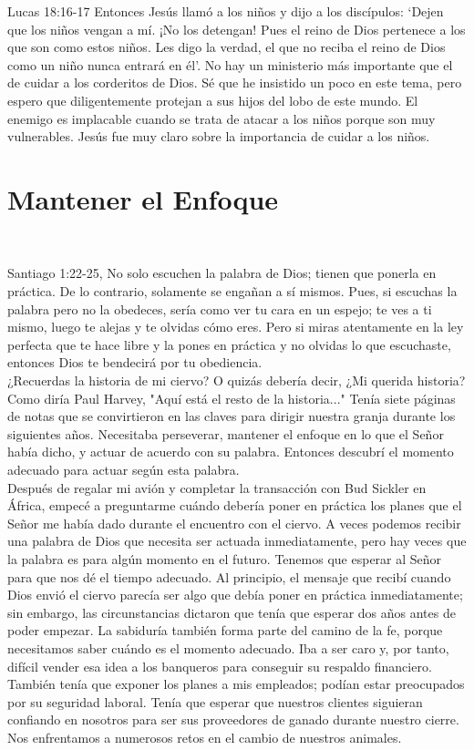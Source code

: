 \documentclass[twoside, 12pt]{book}
\begin{document}
Lucas 18:16-17 Entonces Jesús llamó a los niños y dijo a los discípulos: ‘Dejen que los niños vengan a mí. ¡No los detengan! Pues el reino de Dios pertenece a los que son como estos niños. Les digo la verdad, el que no reciba el reino de Dios como un niño nunca entrará en él’.
No hay un ministerio más importante que el de cuidar a los corderitos de Dios. Sé que he insistido un poco en este tema, pero espero que diligentemente protejan a sus hijos del lobo de este mundo. El enemigo es implacable cuando se trata de atacar a los niños porque son muy vulnerables. Jesús fue muy claro sobre la importancia de cuidar a los niños.\\





\chapter{Mantener el Enfoque}
\

Santiago 1:22-25, No solo escuchen la palabra de Dios; tienen que ponerla en práctica. De lo contrario, solamente se engañan a sí mismos. Pues, si escuchas la palabra pero no la obedeces, sería como ver tu cara en un espejo; te ves a ti mismo, luego te alejas y te olvidas cómo eres. Pero si miras atentamente en la ley perfecta que te hace libre y la pones en práctica y no olvidas lo que escuchaste, entonces Dios te bendecirá por tu obediencia.\\
 
¿Recuerdas la historia de mi ciervo? O quizás debería decir, ¿Mi querida historia? Como diría Paul Harvey, "Aquí está el resto de la historia..." Tenía siete páginas de notas que se convirtieron en las claves para dirigir nuestra granja durante los siguientes años. Necesitaba perseverar, mantener el enfoque en lo que el Señor había dicho, y actuar de acuerdo con su palabra. Entonces descubrí el momento adecuado para actuar según esta palabra.\\

Después de regalar mi avión y completar la transacción con Bud Sickler en África, empecé a preguntarme cuándo debería poner en práctica los planes que el Señor me había dado durante el encuentro con el ciervo. A veces podemos recibir una palabra de Dios que necesita ser actuada inmediatamente, pero hay veces que la palabra es para algún momento en el futuro. Tenemos que esperar al Señor para que nos dé el tiempo adecuado. Al principio, el mensaje que recibí cuando Dios envió el ciervo parecía ser algo que debía poner en práctica inmediatamente; sin embargo, las circunstancias dictaron que tenía que esperar dos años antes de poder empezar. La sabiduría también forma parte del camino de la fe, porque necesitamos saber cuándo es el momento adecuado. Iba a ser caro y, por tanto, difícil vender esa idea a los banqueros para conseguir su respaldo financiero. También tenía que exponer los planes a mis empleados; podían estar preocupados por su seguridad laboral. Tenía que esperar que nuestros clientes siguieran confiando en nosotros para ser sus proveedores de ganado durante nuestro cierre. Nos enfrentamos a numerosos retos en el cambio de nuestros animales.\\
\end{document}
